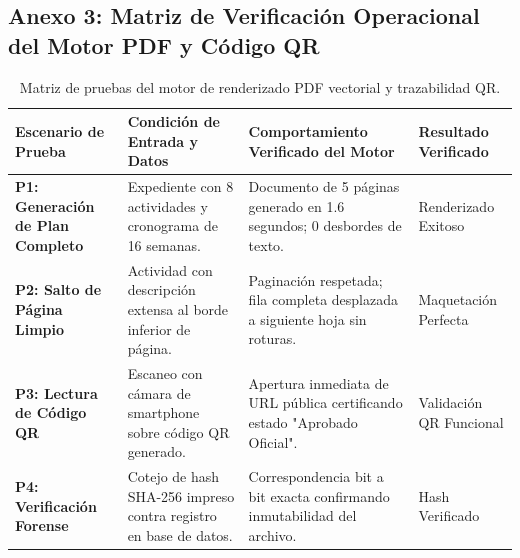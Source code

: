 \documentclass[12pt,a4paper]{article}
\begin{document}
\subsection*{Anexo 3: Matriz de Verificación Operacional del Motor PDF y Código QR}
\begin{table}[H]
\centering
\small
\renewcommand{\arraystretch}{1.15}
\begin{tabularx}{\textwidth}{|>{\hsize=0.75\hsize\raggedright\arraybackslash\bfseries\footnotesize}X|>{\hsize=1.25\hsize\raggedright\arraybackslash\footnotesize}X|>{\hsize=1.35\hsize\raggedright\arraybackslash\footnotesize}X|>{\hsize=0.65\hsize\centering\arraybackslash\footnotesize}X|}
\hline
\rowcolor{tableheader}
\textbf{Escenario de Prueba} & \textbf{Condición de Entrada y Datos} & \textbf{Comportamiento Verificado del Motor} & \textbf{Resultado Verificado} \\
\hline
P1: Generación de Plan Completo & Expediente con 8 actividades y cronograma de 16 semanas. & Documento de 5 páginas generado en 1.6 segundos; 0 desbordes de texto. & Renderizado Exitoso \\
\hline
P2: Salto de Página Limpio & Actividad con descripción extensa al borde inferior de página. & Paginación respetada; fila completa desplazada a siguiente hoja sin roturas. & Maquetación Perfecta \\
\hline
P3: Lectura de Código QR & Escaneo con cámara de smartphone sobre código QR generado. & Apertura inmediata de URL pública certificando estado "Aprobado Oficial". & Validación QR Funcional \\
\hline
P4: Verificación Forense & Cotejo de hash SHA-256 impreso contra registro en base de datos. & Correspondencia bit a bit exacta confirmando inmutabilidad del archivo. & Hash Verificado \\
\hline
\end{tabularx}
\caption{Matriz de pruebas del motor de renderizado PDF vectorial y trazabilidad QR.}
\end{table}
\end{document}
